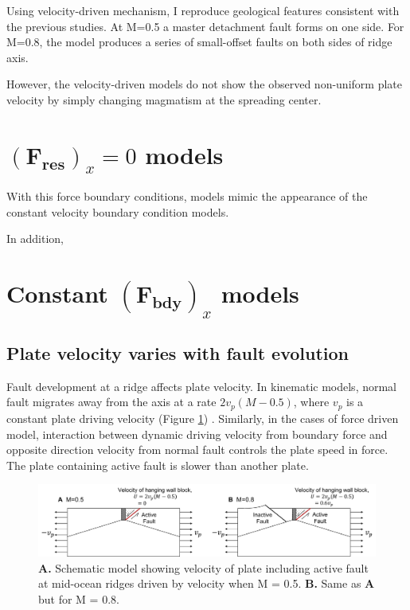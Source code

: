 \documentclass[letterpaper,12pt,notitle]{memphisthesis}                     %
\begin{document}
Using velocity-driven mechanism, I reproduce geological features consistent with the previous studies. At M=0.5 a master detachment fault forms on one side. For M=0.8, the model produces a series of small-offset faults on both sides of ridge axis.

However, the velocity-driven models do not show the observed non-uniform plate velocity by simply changing magmatism at the spreading center.

\section{$(\boldsymbol{F_{res}})_x=0$ models}

With this force boundary conditions, models mimic the appearance of the constant velocity boundary condition models.

In addition, 

\section{Constant $(\boldsymbol{F_{bdy}})_x$ models}

\subsection{Plate velocity varies with fault evolution}

Fault development at a ridge affects plate velocity. In kinematic models, normal fault migrates away from the axis at a rate $2v_p(M-0.5)$, where $v_p$ is a constant plate driving velocity (Figure \ref{fig:hangingwall}) \citep{Buck2005}. Similarly, in the cases of force driven model, interaction between dynamic driving velocity from boundary force and opposite direction velocity from normal fault controls the plate speed in force. The plate containing active fault is slower than another plate.


\begin{figure}[!htb]
	\centering
	\includegraphics[width=0.99\linewidth]{./figs/hangingwall.pdf}
	\caption{\textbf{A.} Schematic model showing velocity of plate including active fault at mid-ocean ridges driven by velocity when M = 0.5. \textbf{B.} Same as \textbf{A} but for M = 0.8. }
	\label{fig:hangingwall}
\end{figure}
\end{document}
